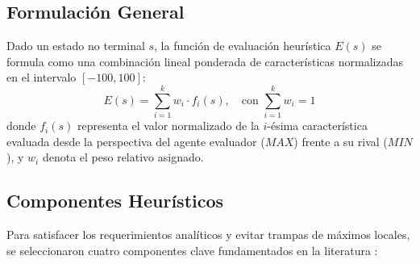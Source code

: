 \documentclass[10pt,a4paper]{article}
\begin{document}
\subsection{Formulación General}
Dado un estado no terminal $s$, la función de evaluación heurística $E(s)$ se formula como una combinación lineal ponderada de características normalizadas en el intervalo $[-100, 100]$:
\begin{equation}
    E(s) = \sum_{i=1}^{k} w_i \cdot f_i(s), \quad \text{con } \sum_{i=1}^{k} w_i = 1
\end{equation}
donde $f_i(s)$ representa el valor normalizado de la $i$-ésima característica evaluada desde la perspectiva del agente evaluador ($MAX$) frente a su rival ($MIN$), y $w_i$ denota el peso relativo asignado.

\subsection{Componentes Heurísticos}
Para satisfacer los requerimientos analíticos y evitar trampas de máximos locales, se seleccionaron cuatro componentes clave fundamentados en la literatura \cite{buro1997logistello, sannidhanam2015ananalysis}:
\end{document}
